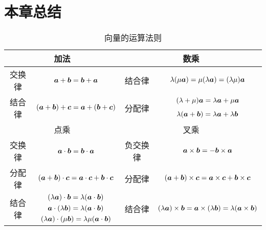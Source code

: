\section{本章总结}

\begin{table}[htb]
	\centering
	\begin{tabular}{|c|c|c|c|}
	\hline
	\multicolumn{2}{|c|}{加法} & \multicolumn{2}{c|}{数乘} \\ \hline
	交换律 & \(\boldsymbol{a}+\boldsymbol{b}=\boldsymbol{b}+\boldsymbol{a}\) &
		结合律 & \(\lambda(\mu\boldsymbol{a})=\mu(\lambda\boldsymbol{a})=(\lambda\mu)\boldsymbol{a}\) \\ \hline
	\multirow{2}{*}{结合律} & \multirow{2}{*}{\((\boldsymbol{a}+\boldsymbol{b})+\boldsymbol{c}=\boldsymbol{a}+(\boldsymbol{b}+\boldsymbol{c})\)} &
		\multirow{2}{*}{分配律} & \((\lambda+\mu)\boldsymbol{a}=\lambda\boldsymbol{a}+\mu\boldsymbol{a}\) \\
	 & & & \(\lambda(\boldsymbol{a}+\boldsymbol{b})=\lambda\boldsymbol{a}+\lambda\boldsymbol{b}\) \\ \hline
	\multicolumn{2}{|c|}{点乘} & \multicolumn{2}{c|}{叉乘} \\ \hline
	交换律 & \(\boldsymbol{a}\cdot\boldsymbol{b}=\boldsymbol{b}\cdot\boldsymbol{a}\) &
		负交换律 & \(\boldsymbol{a}\times\boldsymbol{b}=-\boldsymbol{b}\times\boldsymbol{a}\) \\ \hline
	分配律 & \((\boldsymbol{a}+\boldsymbol{b})\cdot\boldsymbol{c}=\boldsymbol{a}\cdot\boldsymbol{c}+\boldsymbol{b}\cdot\boldsymbol{c}\) &
		分配律 & \((\boldsymbol{a}+\boldsymbol{b})\times\boldsymbol{c}=\boldsymbol{a}\times\boldsymbol{c}+\boldsymbol{b}\times\boldsymbol{c}\) \\ \hline
	\multirow{3}{*}{结合律} & \((\lambda\boldsymbol{a})\cdot\boldsymbol{b}=\lambda(\boldsymbol{a}\cdot\boldsymbol{b})\) & \multirow{3}{*}{结合律} & \multirow{3}{*}{\((\lambda\boldsymbol{a})\times\boldsymbol{b}=\boldsymbol{a}\times(\lambda\boldsymbol{b})=\lambda(\boldsymbol{a}\times\boldsymbol{b})\)} \\
		& \(\boldsymbol{a}\cdot(\lambda\boldsymbol{b})=\lambda(\boldsymbol{a}\cdot\boldsymbol{b})\) & & \\
		& \((\lambda\boldsymbol{a})\cdot(\mu\boldsymbol{b})=\lambda\mu(\boldsymbol{a}\cdot\boldsymbol{b})\) & & \\
	\hline
	\end{tabular}
	\caption{向量的运算法则}
\end{table}
